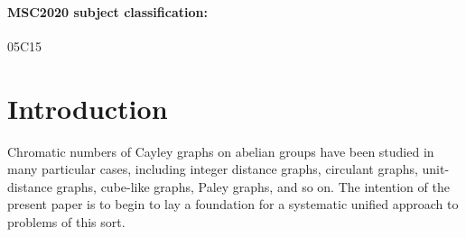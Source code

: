 \documentclass{article}
\theoremstyle{definition}
\theoremstyle{remark}
\begin{document}


\begin{abstract}

In this paper, we take a modest first step towards a systematic study of chromatic numbers of Cayley graphs on abelian groups.  We lose little when we consider these graphs only when they are connected and of finite degree.  As in the work of Heuberger and others, in such cases the graph can be represented by an $m\times r$ integer matrix, where we call $m$ the dimension and $r$ the rank.  Adding or subtracting rows produces a graph homomorphism to a graph with a matrix of smaller dimension, thereby giving an upper bound on the chromatic number of the original graph.  In this article we develop the foundations of this method.  As a demonstration of its utility, we provide an alternate proof of Payan's theorem, which states that a cubelike graph (i.e., a Cayley graph on the product $\mathbb{Z}_2\times\cdots\times\mathbb{Z}_2$ of the integers modulo $2$ with itself finitely many times) cannot have chromatic number $3$.  In a series of follow-up articles using the method of Heuberger matrices, we completely determine the chromatic number in cases with small dimension and rank, as well as prove a generalization of Zhu's theorem on the chromatic number of $6$-valent integer distance graphs.
\end{abstract}

\paragraph*{MSC2020 subject classification: }05C15

\section{Introduction}


Chromatic numbers of Cayley graphs on abelian groups have been studied in many particular cases, including integer distance graphs, circulant graphs, unit-distance graphs, cube-like graphs, Paley graphs, and so on.  The intention of the present paper is to begin to lay a foundation for a systematic unified approach to problems of this sort.
\end{document}
